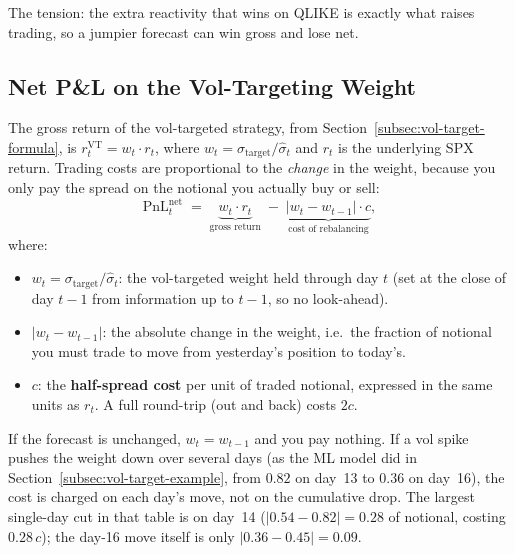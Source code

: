 The tension: the extra reactivity that wins on QLIKE is exactly what raises trading, so a jumpier forecast can win gross and lose net.

\subsection{Net P\&L on the Vol-Targeting Weight}
\label{subsec:net-pnl}

The gross return of the vol-targeted strategy, from Section~\ref{subsec:vol-target-formula}, is $r_t^{\text{VT}} = w_t \cdot r_t$, where $w_t = \sigma_{\text{target}}/\hat\sigma_t$ and $r_t$ is the underlying SPX return. Trading costs are proportional to the \emph{change} in the weight, because you only pay the spread on the notional you actually buy or sell:
\begin{equation}
\label{eq:net-pnl-vt}
\text{PnL}_t^{\text{net}} \;=\; \underbrace{w_t \cdot r_t}_{\text{gross return}} \;-\; \underbrace{|w_t - w_{t-1}| \cdot c}_{\text{cost of rebalancing}},
\end{equation}
where:
\begin{itemize}[nosep]
  \item $w_t = \sigma_{\text{target}}/\hat\sigma_t$: the vol-targeted weight held through day $t$ (set at the close of day $t-1$ from information up to $t-1$, so no look-ahead).
  \item $|w_t - w_{t-1}|$: the absolute change in the weight, i.e.\ the fraction of notional you must trade to move from yesterday's position to today's.
  \item $c$: the \textbf{half-spread cost} per unit of traded notional, expressed in the same units as $r_t$. A full round-trip (out and back) costs $2c$.
\end{itemize}
If the forecast is unchanged, $w_t = w_{t-1}$ and you pay nothing. If a vol spike pushes the weight down over several days (as the ML model did in Section~\ref{subsec:vol-target-example}, from $0.82$ on day~13 to $0.36$ on day~16), the cost is charged on each day's move, not on the cumulative drop. The largest single-day cut in that table is on day~14 ($|0.54 - 0.82| = 0.28$ of notional, costing $0.28\,c$); the day-16 move itself is only $|0.36 - 0.45| = 0.09$.

